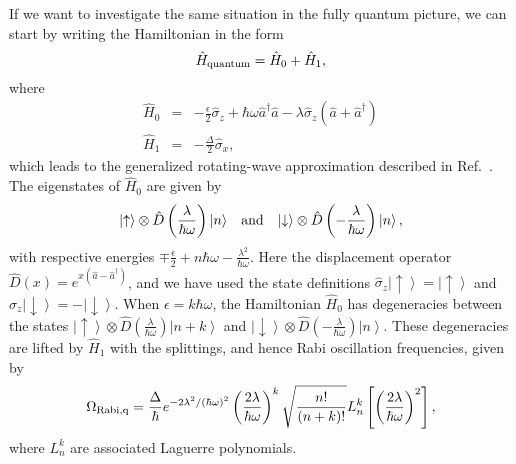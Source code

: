 \documentclass[aps,twocolumn,superscriptaddress]{revtex4}
\newcommand{\ket}[1] {\left| #1 \right\rangle}
\begin{document}
If we want to investigate the same situation in the fully quantum picture, we can start by writing the Hamiltonian in the form
%
\begin{equation}
\hat{H}_{\rm quantum} = \hat{H}_0 + \hat{H}_1,
\end{equation}
%
where
%
\begin{eqnarray}
\hat{H}_0 & = & -\frac{\epsilon}{2} \hat{\sigma}_z+\hbar\omega \hat{a}^{\dagger}\hat{a} - \lambda \hat{\sigma}_z \left( \hat{a} + \hat{a}^{\dagger} \right) \nonumber \\
%
\hat{H}_1 & = & -\frac{\Delta}{2} \hat{\sigma}_x,
\end{eqnarray}
%
which leads to the generalized rotating-wave approximation described in Ref.~\cite{Irish}. The eigenstates of $\hat{H}_0$ are given by
%
\begin{eqnarray}
\ket{\uparrow}\otimes\hat{D}\left(\frac{\lambda}{\hbar\omega}\right)\ket{n} \;\;\; {\rm and} \;\;\;
%
\ket{\downarrow}\otimes\hat{D}\left(-\frac{\lambda}{\hbar\omega}\right)\ket{n},
%
\label{Eq:GRWABasisStates}
\end{eqnarray}
%
with respective energies $\mp\frac{\epsilon}{2}+n\hbar\omega-\frac{\lambda^2}{\hbar\omega}$. Here the displacement operator $\hat{D}(x)=e^{x\left(\hat{a} - \hat{a}^{\dagger}\right)}$, and we have used the state definitions $\hat{\sigma}_z\ket{\uparrow}=\ket{\uparrow}$ and $\hat{\sigma}_z\ket{\downarrow}=-\ket{\downarrow}$. When $\epsilon=k\hbar\omega$, the Hamiltonian $\hat{H}_0$ has degeneracies between the states $\ket{\uparrow}\otimes\hat{D}\left(\frac{\lambda}{\hbar\omega}\right)\ket{n+k}$ and $\ket{\downarrow}\otimes\hat{D}\left(-\frac{\lambda}{\hbar\omega}\right)\ket{n}$. These degeneracies are lifted by $\hat{H}_1$ with the splittings, and hence Rabi oscillation frequencies, given by
%
\begin{equation}
\Omega_{\rm Rabi,q} = \frac{\Delta}{\hbar} e^{-2\lambda^2/(\hbar\omega)^2} \left(\frac{2\lambda}{\hbar\omega}\right)^k \sqrt{\frac{n!}{(n+k)!}} L_{n}^{k}\left[\left(\frac{2\lambda}{\hbar\omega}\right)^2\right],
%
\label{Eq:RabiFrequencyQuantum}
\end{equation}
%
where $L_{n}^k$ are associated Laguerre polynomials.
\end{document}

